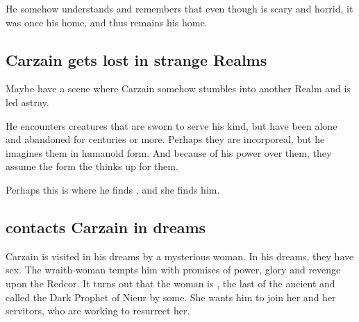 
He somehow understands and remembers that even though \Nyx{} is scary and horrid, it was once his home, and thus remains his home. 










\subsection{Carzain gets lost in strange Realms}
Maybe have a scene where Carzain somehow stumbles into another Realm and is led astray. 

He encounters creatures that are sworn to serve his kind, but have been alone and abandoned for centuries or more. Perhaps they are incorporeal, but he imagines them in humanoid form. And because of his power over them, they assume the form the thinks up for them.

Perhaps this is where he finds \Belzir, and she finds him.







\subsection{\Belzir contacts Carzain in dreams}
Carzain is visited in his dreams by a mysterious woman. In his dreams, they have sex. The wraith-woman tempts him with promises of power, glory and revenge upon the Redcor. It turns out that the woman is \Belzir, the last \Calipha of the ancient \VaimonCaliphate and called the Dark Prophet of Nieur by some. She wants him to join her and her servitors, who are working to resurrect her. 

